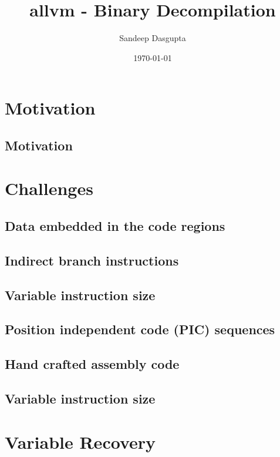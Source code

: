 \documentclass[mathserif,10pt]{beamer}
\title[allvm]{allvm - Binary Decompilation}
\author{Sandeep Dasgupta}
\institute[UIUC]{University of Illinois Urbana Champaign}
\date{\today}
\begin{document}
\begin{frame}
\titlepage
\end{frame}



\section{Motivation}
\subsection{Motivation}
\frame
{
  \frametitle{\subsecname}
}

\section{Challenges}
  \subsection{Data embedded in the code regions}
  \frame
  {
    \frametitle{\subsecname}
  }

  \subsection{Indirect branch instructions}
  \frame
  {
    \frametitle{\subsecname}
  }

  \subsection{Variable instruction size}
  \frame
  {
    \frametitle{\subsecname}
  }

  \subsection{Position independent code (PIC) sequences}
  \frame
  {
    \frametitle{\subsecname}
  }

  \subsection{Hand crafted assembly code}
  \frame
  {
    \frametitle{\subsecname}
  }

  \subsection{Variable instruction size}
  \frame
  {
    \frametitle{\subsecname}
  }

\section{Variable Recovery}
\end{document}
